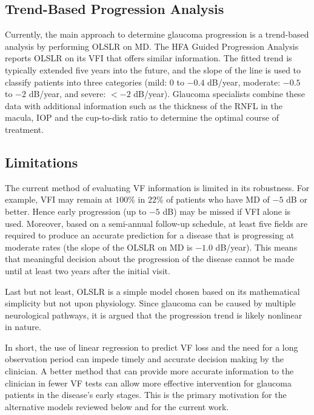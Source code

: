 \subsection{Trend-Based Progression Analysis}

Currently, the main approach to determine glaucoma progression is a trend-based analysis by performing \ac{OLSLR} on \ac{MD}. The \ac{HFA} Guided Progression Analysis reports \ac{OLSLR} on its \ac{VFI} that offers similar information. The fitted trend is typically extended five years into the future, and the slope of the line is used to classify patients into three categories (mild: $0$ to $-0.4$ dB/year, moderate: $-0.5$ to $-2$ dB/year, and severe: $<-2$ dB/year). \cite{Chauhan2008} Glaucoma specialists combine these data with additional information such as the thickness of the \ac{RNFL} in the macula, \ac{IOP} and the cup-to-disk ratio to determine the optimal course of treatment. 

\subsection{Limitations}

The current method of evaluating \acl{VF} information is limited in its robustness. For example, \ac{VFI} may remain at $100\%$ in $22\%$ of patients who have MD of $-5$ dB or better. Hence early progression (up to $-5$ dB) may be missed if \ac{VFI} alone is used. Moreover, based on a semi-annual follow-up schedule, at least five fields are required to produce an accurate prediction for a disease that is progressing at moderate rates (the slope of the \ac{OLSLR} on \ac{MD} is $-1.0$ dB/year). \cite{Chauhan2008} This means that meaningful decision about the progression of the disease cannot be made until at least two years after the initial visit. 

Last but not least, \ac{OLSLR} is a simple model chosen based on its mathematical simplicity but not upon physiology. Since glaucoma can be caused by multiple neurological pathways, it is argued that the progression trend is likely nonlinear in nature. \cite{Pathak2013} 

In short, the use of linear regression to predict \acl{VF} loss and the need for a long observation period can impede timely and accurate decision making by the clinician. A better method that can provide more accurate information to the clinician in fewer \acl{VF} tests can allow more effective intervention for glaucoma patients in the disease's early stages. This is the primary motivation for the alternative models reviewed below and for the current work.

